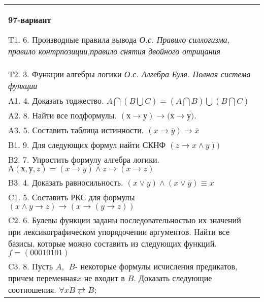 \documentclass{article}
\begin{document}
\begin{tabular}{m{17cm}}
\textbf{97-вариант}
\newline

T1. 6. Производные правила вывода \emph{О.с. Правило силлогизма, правило контрпозиции,правило снятия двойного отрицания} \\
T2. 3. Функции алгебры логики \emph{О.с. Алгебра Буля. Полная система функции} \\
A1. 4. Доказать тоджество. \(A\bigcap(B\bigcup C) = (A\bigcap B)\bigcup(B\bigcap C)\) \\
A2. 8. Найти все подформулы. \((х \rightarrow у) \rightarrow (\overline{х} \rightarrow \overline{у)}\). \\
A3. 5. Составить таблица истинности. \((x \rightarrow \overline{y}) \rightarrow \overline{x}\) \\
B1. 9. Для следующих формул найти СКНФ \((z \rightarrow x \land y))\) \\
B2. 7. Упростить формулу алгебра логики. \(А(х,у,z) = (x \rightarrow y) \land z \rightarrow (x \rightarrow z)\) \\
B3. 4. Доказать равносильность. \((x \vee y) \land (x \vee \overline{y}) \equiv x\) \\
C1. 5. Составить РКС для формулы \((x \land y \rightarrow z) \rightarrow (x \rightarrow (y \rightarrow z))\) \\
C2. 6. Булевы функции заданы последовательностью их значений при лексикографическом упорядочении аргументов. Найти все базисы, которые можно составить из следующих функций. \(f = (00010101)\) \\
C3. 8. Пусть \(A,\ \ B\)- некоторые формулы исчисления предикатов, причем переменная\(x\) не входит в \(B\). Доказать следующие соотношения. \(\forall xB \rightleftarrows B\); \\

\end{tabular}
\vspace{1cm}
\end{document}
